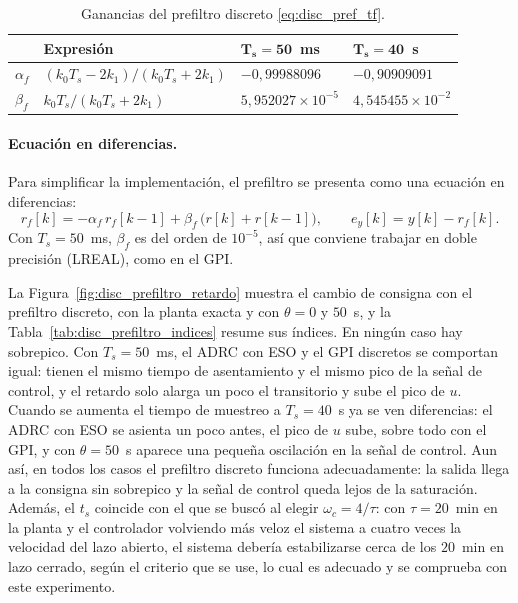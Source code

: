 \begin{table}[H]
\centering
\caption{Ganancias del prefiltro discreto \eqref{eq:disc_pref_tf}.}
\label{tab:disc_pref}
\renewcommand{\arraystretch}{1.3}
\begin{tabular}{llll}
\toprule
 & \textbf{Expresión} & $\boldsymbol{T_s = 50}$~\textbf{ms} & $\boldsymbol{T_s = 40}$~\textbf{s} \\
\midrule
$\alpha_f$ & $(k_0 T_s - 2 k_1)/(k_0 T_s + 2 k_1)$ & $-0{,}99988096$ & $-0{,}90909091$ \\
$\beta_f$ & $k_0 T_s/(k_0 T_s + 2 k_1)$ & $5{,}952027\times10^{-5}$ & $4{,}545455\times10^{-2}$ \\
\bottomrule
\end{tabular}
\end{table}

\paragraph{Ecuación en diferencias.} Para simplificar la implementación, el prefiltro se presenta
como una ecuación en diferencias:
\begin{equation}
r_f[k] = -\alpha_f\,r_f[k-1] + \beta_f\,\bigl(r[k] + r[k-1]\bigr),
\qquad
e_y[k] = y[k] - r_f[k] .
\label{eq:disc_pref_dif}
\end{equation}
Con $T_s = 50$~ms, $\beta_f$ es del orden de $10^{-5}$, así que conviene trabajar en doble precisión
(LREAL), como en el GPI.

La Figura~\ref{fig:disc_prefiltro_retardo} muestra el cambio de consigna con el prefiltro discreto, con
la planta exacta y con $\theta = 0$ y $50$~s, y la Tabla~\ref{tab:disc_prefiltro_indices} resume sus
índices. En ningún caso hay sobrepico. Con $T_s = 50$~ms, el ADRC con ESO y el GPI discretos se comportan
igual: tienen el mismo tiempo de asentamiento y el mismo pico de la señal de control, y el retardo
solo alarga un poco el transitorio y sube el pico de $u$. Cuando se aumenta el tiempo de muestreo a
$T_s = 40$~s ya se ven diferencias: el ADRC con ESO se asienta un poco antes, el pico de $u$ sube, sobre todo
con el GPI, y con $\theta = 50$~s aparece una pequeña oscilación en la señal de control. Aun así, en
todos los casos el prefiltro discreto funciona adecuadamente: la salida llega a la consigna sin
sobrepico y la señal de control queda lejos de la saturación. Además, el $t_s$ coincide con el que se
buscó al elegir $\omega_c = 4/\tau$: con $\tau = 20$~min en la planta y el controlador volviendo más veloz el sistema a
cuatro veces la velocidad del lazo abierto, el sistema debería estabilizarse cerca de los $20$~min en
lazo cerrado, según el criterio que se use, lo cual es adecuado y se comprueba con este experimento.

